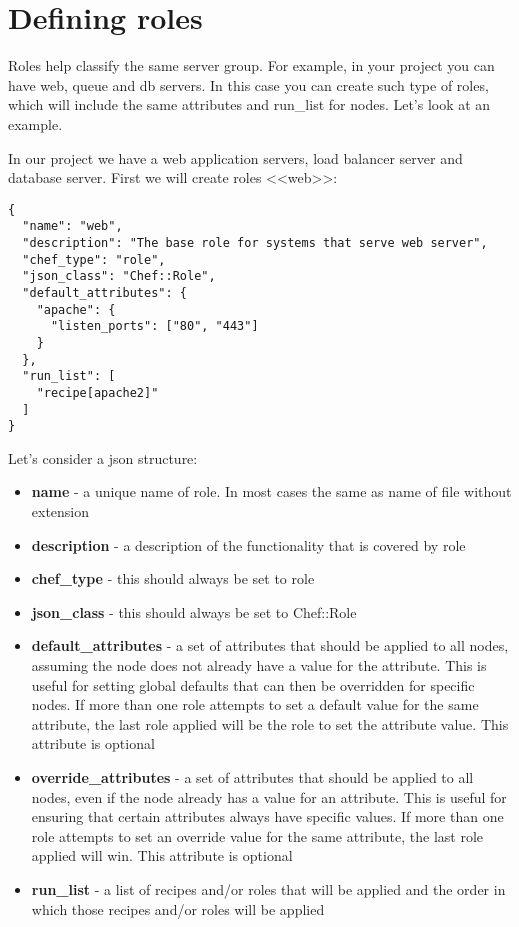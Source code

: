 \section{Defining roles}\label{sec:solo-role}

Roles help classify the same server group. For example, in your project you can have web, queue and db servers. In this case you can create such type of roles, which will include the same attributes and run\_list for nodes. Let's look at an example.

In our project we have a web application servers, load balancer server and database server. First we will create roles <<web>>:

\begin{lstlisting}[label=lst:my-cloud-role1,title=my-cloud/roles/web.json]
{
  "name": "web",
  "description": "The base role for systems that serve web server",
  "chef_type": "role",
  "json_class": "Chef::Role",
  "default_attributes": {
    "apache": {
      "listen_ports": ["80", "443"]
    }
  },
  "run_list": [
    "recipe[apache2]"
  ]
}
\end{lstlisting}

Let's consider a json structure:

\begin{itemize}
  \item \textbf{name} - a unique name of role. In most cases the same as name of file without extension
  \item \textbf{description} - a description of the functionality that is covered by role
  \item \textbf{chef\_type} - this should always be set to role
  \item \textbf{json\_class} - this should always be set to Chef::Role
  \item \textbf{default\_attributes} - a set of attributes that should be applied to all nodes, assuming the node does not already have a value for the attribute. This is useful for setting global defaults that can then be overridden for specific nodes. If more than one role attempts to set a default value for the same attribute, the last role applied will be the role to set the attribute value. This attribute is optional
  \item \textbf{override\_attributes} - a set of attributes that should be applied to all nodes, even if the node already has a value for an attribute. This is useful for ensuring that certain attributes always have specific values. If more than one role attempts to set an override value for the same attribute, the last role applied will win. This attribute is optional
  \item \textbf{run\_list} - a list of recipes and/or roles that will be applied and the order in which those recipes and/or roles will be applied
\end{itemize}

